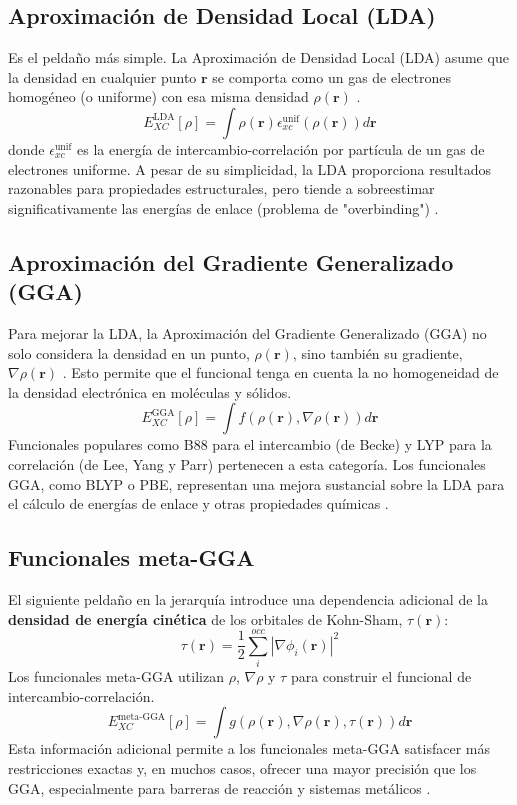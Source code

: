 \subsection{Aproximación de Densidad Local (LDA)}
Es el peldaño más simple. La Aproximación de Densidad Local (LDA) asume que la densidad en cualquier punto $\mathbf{r}$ se comporta como un gas de electrones homogéneo (o uniforme) con esa misma densidad $\rho(\mathbf{r})$ \cite[90]{koch2015chemist}.
$$ E_{XC}^{\text{LDA}}[\rho] = \int \rho(\mathbf{r}) \epsilon_{xc}^{\text{unif}}(\rho(\mathbf{r})) d\mathbf{r} $$
donde $\epsilon_{xc}^{\text{unif}}$ es la energía de intercambio-correlación por partícula de un gas de electrones uniforme. A pesar de su simplicidad, la LDA proporciona resultados razonables para propiedades estructurales, pero tiende a sobreestimar significativamente las energías de enlace (problema de "overbinding") \cite[91]{koch2015chemist}.

\subsection{Aproximación del Gradiente Generalizado (GGA)}
Para mejorar la LDA, la Aproximación del Gradiente Generalizado (GGA) no solo considera la densidad en un punto, $\rho(\mathbf{r})$, sino también su gradiente, $\nabla\rho(\mathbf{r})$ \cite[92]{koch2015chemist}. Esto permite que el funcional tenga en cuenta la no homogeneidad de la densidad electrónica en moléculas y sólidos.
$$ E_{XC}^{\text{GGA}}[\rho] = \int f(\rho(\mathbf{r}), \nabla\rho(\mathbf{r})) d\mathbf{r} $$
Funcionales populares como B88 para el intercambio (de Becke) y LYP para la correlación (de Lee, Yang y Parr) pertenecen a esta categoría. Los funcionales GGA, como BLYP o PBE, representan una mejora sustancial sobre la LDA para el cálculo de energías de enlace y otras propiedades químicas \cite[p. 9]{MD-2002-01}.

\subsection{Funcionales meta-GGA}
El siguiente peldaño en la jerarquía introduce una dependencia adicional de la \textbf{densidad de energía cinética} de los orbitales de Kohn-Sham, $\tau(\mathbf{r})$:
$$ \tau(\mathbf{r}) = \frac{1}{2} \sum_i^{occ} |\nabla\phi_i(\mathbf{r})|^2 $$
Los funcionales meta-GGA utilizan $\rho$, $\nabla\rho$ y $\tau$ para construir el funcional de intercambio-correlación.
$$ E_{XC}^{\text{meta-GGA}}[\rho] = \int g(\rho(\mathbf{r}), \nabla\rho(\mathbf{r}), \tau(\mathbf{r})) d\mathbf{r} $$
Esta información adicional permite a los funcionales meta-GGA satisfacer más restricciones exactas y, en muchos casos, ofrecer una mayor precisión que los GGA, especialmente para barreras de reacción y sistemas metálicos \cite[p. 9]{MD-2002-01}.

